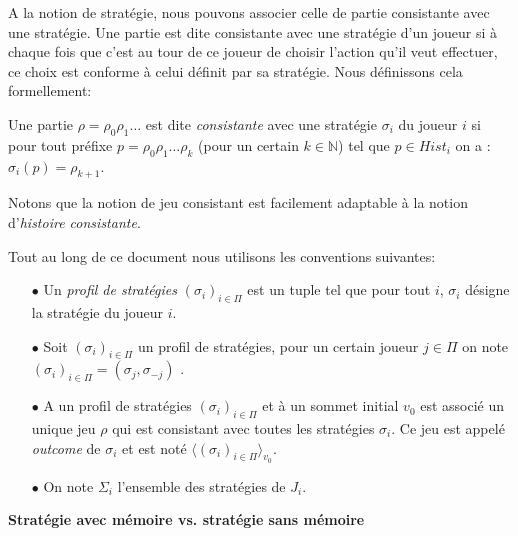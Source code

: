 A la notion de stratégie, nous pouvons associer celle de partie consistante avec une stratégie. Une partie est dite consistante avec une stratégie d'un joueur  si à chaque fois que c'est au tour de ce joueur de choisir l'action qu'il veut effectuer, ce choix est conforme à celui définit par sa stratégie. Nous définissons cela formellement:

\begin{defi}	
	Une partie $\rho = \rho _{0}  \rho _{1} \ldots$ est dite \textit{consistante} avec une stratégie $\sigma _{i}$ du joueur $i$ si pour tout préfixe $p = \rho _{0}\rho _{1}\ldots \rho _{k}$ (pour un certain $k \in \mathbb{N}$) tel que $p \in Hist_{i}$ on a : $\sigma _{i}(p) = \rho_{k+1}$.	
\end{defi}

	Notons que la notion de jeu consistant est facilement adaptable à la notion d'\textit{histoire consistante}.

\begin{notations}
	Tout au long de ce document nous utilisons les conventions suivantes:
	\begin{enumerate}
		\item[$\bullet$] Un \textit{profil de stratégies} $(\sigma _{i})_{i \in \Pi}$ est un tuple tel que pour tout $i$, $\sigma _{i}$ désigne la stratégie du 	joueur $i$. 
				
		\item[$\bullet$] Soit  $(\sigma _{i})_{i \in \Pi}$ un profil de stratégies, pour un certain joueur $j\in \Pi $ on note $(\sigma _{i})_{i \in \Pi} = ( \sigma _{j},\sigma _{-j})$ .
		
		\item[$\bullet$] A un profil de stratégies $(\sigma _{i})_{i \in \Pi}$ et à un sommet initial $v_{0}$ est associé un unique jeu $\rho$ qui est consistant avec toutes les stratégies $\sigma _{i}$. Ce jeu est appelé \textit{outcome} de $\sigma _{i}$ et est noté $\langle (\sigma _{i})_{i\in \Pi} \rangle_{v_0}$.
		
		\item[$\bullet$] On note $\Sigma _{i}$ l'ensemble des stratégies de $J_{i}$.
		
	\end{enumerate}
\end{notations}
		



\noindent\textbf{Stratégie avec mémoire vs. stratégie sans mémoire}\\



